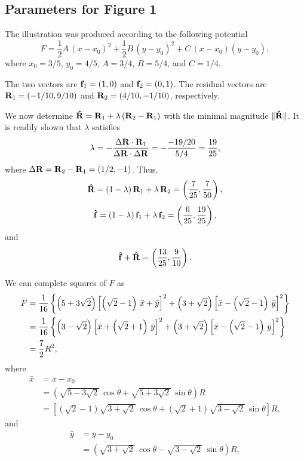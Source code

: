 \documentclass[aip,jcp,preprint,notitlepage, superscriptaddress]{revtex4-1}
\begin{document}
\subsection{Parameters for Figure 1}



The illustration was produced according to the following potential
%
\begin{equation}
F
=
\frac{1}{2} A \, ( x - x_0 )^2
+
\frac{1}{2} B \, ( y - y_0 )^2
+
C \, ( x - x_0 ) ( y - y_0 ),
\label{eq:fig1_F}
\end{equation}
%
where
$x_0 = 3/5$,
$y_0 = 4/5$,
$A = 3/4$,
$B = 5/4$,
and
$C = 1/4$.



The two vectors are
$\mathbf{f}_1 = (1, 0)$
and
$\mathbf{f}_2 = (0, 1)$.
%
The residual vectors are
$\mathbf{R}_1 = (-1/10, 9/10)$
and
$\mathbf{R}_2 = (4/10, -1/10)$,
respectively.



We now determine
$\mathbf{\hat R} = \mathbf{R}_1 + \lambda \, (\mathbf{R}_2 - \mathbf{R}_1)$
with the minimal magnitude
$\| \mathbf{\hat R} \|$.
%
It is readily shown that
$\lambda$ satisfies
%
\[
\lambda
=
-\frac{
  \Delta \mathbf{R} \cdot \mathbf{R}_1
}
{
  \Delta \mathbf{R} \cdot \Delta \mathbf{R}
}
=
-\frac{-19/20}{5/4}
=
\frac{19}{25},
\]
%
where
$\Delta \mathbf{R} = \mathbf{R}_2 - \mathbf{R}_1 = (1/2, -1)$.
%
Thus,
\[
\mathbf{\hat R}
=
(1 - \lambda) \, \mathbf{R}_1
+ \lambda \, \mathbf{R}_2
=
\left(
  \frac{7}{25},
  \frac{7}{50}
\right),
\]
\[
\mathbf{\hat f}
=
(1 - \lambda) \, \mathbf{f}_1
+ \lambda \, \mathbf{f}_2
=
\left(
  \frac{6}{25},
  \frac{19}{25}
\right),
\]
and
\[
\mathbf{\hat f}
+
\mathbf{\hat R}
=
\left(
  \frac{13}{25},
  \frac{9}{10}
\right).
\]



We can complete squares of $F$ as
%
\begin{align*}
F
&=
\frac{1}{16}
\left\{
  \left( 5 + 3 \sqrt 2 \right)
  \left[
    \left( \sqrt 2 - 1 \right) \, \bar x
  +
    \bar y
  \right]^2
  +
  \left( 3 + \sqrt 2 \right)
  \left[
    \bar x
  -
    \left( \sqrt 2 - 1 \right) \, \bar y
  \right]^2
\right\}
\notag \\
%
&=
\frac{1}{16}
\left\{
  \left( 3 - \sqrt 2 \right)
  \left[
    \bar x
  +
    \left( \sqrt 2 + 1 \right) \, \bar y
  \right]^2
  +
  \left( 3 + \sqrt 2 \right)
  \left[
    \bar x
  -
    \left( \sqrt 2 - 1 \right) \, \bar y
  \right]^2
\right\}
\notag \\
%
&=
\frac{7}{2} R^2,
\end{align*}
%
where
%
\begin{align*}
\bar x
&= x - x_0
\\
&=
\left(
  \sqrt{ 5 - 3 \sqrt{2} } \, \cos \theta
  +
  \sqrt{ 5 + 3 \sqrt{2} } \, \sin \theta
\right) R
\\
&=
\left[
  \left( \sqrt 2 - 1 \right) \sqrt{ 3 + \sqrt{2} } \, \cos \theta
  +
  \left( \sqrt 2 + 1 \right) \sqrt{ 3 - \sqrt{2} } \, \sin \theta
\right] R,
\end{align*}
%
and
%
\begin{align*}
\bar y
&= y - y_0
\\
&=
\left(
  \sqrt{ 3 + \sqrt{2} } \, \cos \theta
  -
  \sqrt{ 3 - \sqrt{2} } \, \sin \theta
\right) R,
\end{align*}
\end{document}
